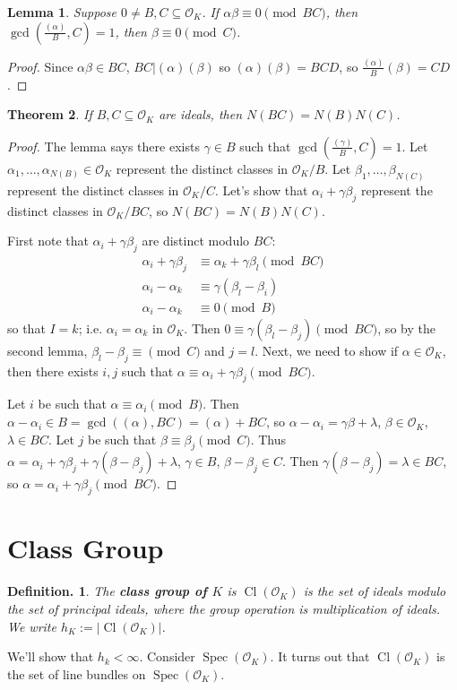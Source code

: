 \documentclass[11pt, a4paper]{memoir}
\theoremstyle{change}
\newtheorem{theorem}{Theorem}[section]
\newtheorem{lemma}[theorem]{Lemma}
\theoremstyle{plain}
\theoremstyle{nonumberplain}
\newtheorem{definition}{Definition.}
\newtheorem{proof}{Proof}
\DeclareMathOperator{\Spec}{Spec}
\DeclareMathOperator{\Cl}{Cl}
\begin{document}
\begin{lemma}
    Suppose $0\neq B,C\subseteq\mathcal{O}_K$.
    If $\alpha\beta\equiv 0\pmod{BC}$, then $\gcd\left(\frac{(\alpha)}{B},C\right)=1$, then $\beta\equiv 0\pmod{C}$.
\end{lemma}
\begin{proof}
    Since $\alpha\beta\in BC$, $BC|(\alpha)(\beta)$ so $(\alpha)(\beta)=BCD$, so $\frac{(\alpha)}{B}(\beta)=CD$.
\end{proof}
\begin{theorem}
    If $B,C\subseteq\mathcal{O}_K$ are ideals, then $N(BC)=N(B)N(C)$.
\end{theorem}
\begin{proof}
    The lemma says there exists $\gamma\in B$ such that $\gcd\left(\frac{(\gamma)}{B},C\right)=1$.
    Let $\alpha_1,\ldots,\alpha_{N(B)}\in\mathcal{O}_K$ represent the distinct classes in $\mathcal{O}_K/B$.
    Let $\beta_1,\ldots,\beta_{N(C)}$ represent the distinct classes in $\mathcal{O}_K/C$.
    Let's show that $\alpha_i+\gamma\beta_j$ represent the distinct classes in $\mathcal{O}_K/BC$, so $N(BC)=N(B)N(C)$.

    First note that $\alpha_i+\gamma\beta_j$ are distinct modulo $BC$:
    \begin{align*}
        \alpha_i+\gamma\beta_j &\equiv\alpha_k+\gamma\beta_l\pmod{BC}\\
        \alpha_i-\alpha_k &\equiv\gamma(\beta_l-\beta_i)\\
        \alpha_i-\alpha_k &\equiv 0\pmod{B}
    \end{align*}
    so that $I=k$; i.e. $\alpha_i=\alpha_k$ in $\mathcal{O}_K$.
    Then $0\equiv\gamma(\beta_l-\beta_j)\pmod{BC}$, so by the second lemma, $\beta_l-\beta_j\equiv \pmod{C}$ and $j=l$.
    Next, we need to show if $\alpha\in\mathcal{O}_K$, then there exists $i,j$ such that $\alpha\equiv\alpha_i+\gamma\beta_j\pmod{BC}$.

    Let $i$ be such that $\alpha\equiv\alpha_i\pmod{B}$.
    Then $\alpha-\alpha_i\in B=\gcd((\alpha),BC)=(\alpha)+BC$, so $\alpha-\alpha_i=\gamma\beta+\lambda$, $\beta\in\mathcal{O}_K$, $\lambda\in BC$.
    Let $j$ be such that $\beta\equiv\beta_j\pmod{C}$.
    Thus $\alpha=\alpha_i+\gamma\beta_j+\gamma(\beta-\beta_j)+\lambda$, $\gamma\in B$, $\beta-\beta_j\in C$.
    Then $\gamma(\beta-\beta_j)=\lambda\in BC$, so $\alpha=\alpha_i+\gamma\beta_j\pmod{BC}$.
\end{proof}
\section{Class Group}
\begin{definition}
    The \textbf{class group of $K$} is $\Cl(\mathcal{O}_K)$ is the set of ideals modulo the set of principal ideals, where the group operation is multiplication of ideals.
    We write $h_K:=|\Cl(\mathcal{O}_K)|$.
\end{definition}
We'll show that $h_k<\infty$.
Consider $\Spec(\mathcal{O}_K)$.
It turns out that $\Cl(\mathcal{O}_K)$ is the set of line bundles on $\Spec(\mathcal{O}_K)$.
\end{document}
